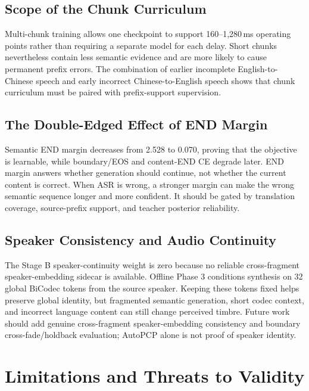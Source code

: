 \documentclass[11pt,a4paper]{article}
\begin{document}
\subsection{Scope of the Chunk Curriculum}

Multi-chunk training allows one checkpoint to support 160--1,280\,ms operating points rather than requiring a separate model for each delay. Short chunks nevertheless contain less semantic evidence and are more likely to cause permanent prefix errors. The combination of earlier incomplete English-to-Chinese speech and early incorrect Chinese-to-English speech shows that chunk curriculum must be paired with prefix-support supervision.

\subsection{The Double-Edged Effect of END Margin}

Semantic END margin decreases from 2.528 to 0.070, proving that the objective is learnable, while boundary/EOS and content-END CE degrade later. END margin answers whether generation should continue, not whether the current content is correct. When ASR is wrong, a stronger margin can make the wrong semantic sequence longer and more confident. It should be gated by translation coverage, source-prefix support, and teacher posterior reliability.

\subsection{Speaker Consistency and Audio Continuity}

The Stage B speaker-continuity weight is zero because no reliable cross-fragment speaker-embedding sidecar is available. Offline Phase 3 conditions synthesis on 32 global BiCodec tokens from the source speaker. Keeping these tokens fixed helps preserve global identity, but fragmented semantic generation, short codec context, and incorrect language content can still change perceived timbre. Future work should add genuine cross-fragment speaker-embedding consistency and boundary cross-fade/holdback evaluation; AutoPCP alone is not proof of speaker identity.

\section{Limitations and Threats to Validity}
\end{document}
